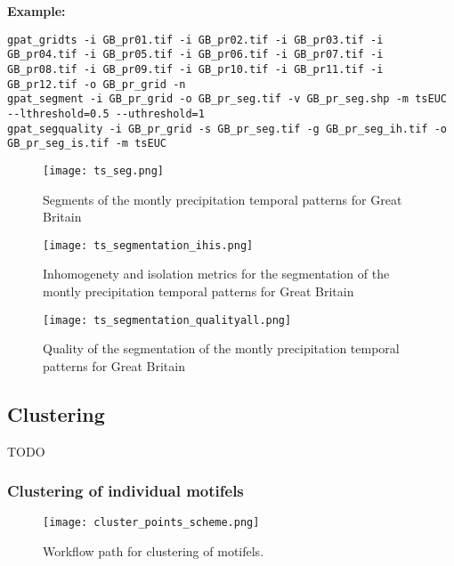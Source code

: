 {\bf Example:}

\begin{minipage}{\linewidth}
\begin{lstlisting}
gpat_gridts -i GB_pr01.tif -i GB_pr02.tif -i GB_pr03.tif -i GB_pr04.tif -i GB_pr05.tif -i GB_pr06.tif -i GB_pr07.tif -i GB_pr08.tif -i GB_pr09.tif -i GB_pr10.tif -i GB_pr11.tif -i GB_pr12.tif -o GB_pr_grid -n
gpat_segment -i GB_pr_grid -o GB_pr_seg.tif -v GB_pr_seg.shp -m tsEUC --lthreshold=0.5 --uthreshold=1
gpat_segquality -i GB_pr_grid -s GB_pr_seg.tif -g GB_pr_seg_ih.tif -o GB_pr_seg_is.tif -m tsEUC
\end{lstlisting}
\end{minipage}

\begin{figure}[H]
	\centering
	\texttt{[image: ts\_seg.png]}
	\caption{Segments of the montly precipitation temporal patterns for Great Britain}
	\label{FIG:SEGTS1}
\end{figure}

\begin{figure}[H]
	\centering
	\texttt{[image: ts\_segmentation\_ihis.png]}
	\caption{Inhomogenety and isolation metrics for the segmentation of the montly precipitation temporal patterns for Great Britain}
	\label{FIG:SEGTS2}
\end{figure}

\begin{figure}[H]
	\centering
	\texttt{[image: ts\_segmentation\_qualityall.png]}
	\caption{Quality of the segmentation of the montly precipitation temporal patterns for Great Britain}
	\label{FIG:SEGTS3}
\end{figure}


\FloatBarrier

\subsection{Clustering}
TODO

\subsubsection{Clustering of individual motifels}

\begin{figure}[H]
	\centering
	\texttt{[image: cluster\_points\_scheme.png]}
	\caption{Workflow path for clustering of motifels.}
	\label{FIG:CLUSTER_POINTS}
\end{figure}

